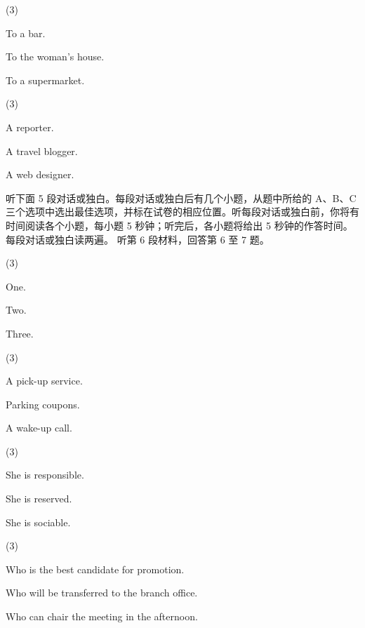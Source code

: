 \documentclass{英语试卷}
\begin{document}
\begin{choices}(3)
  \item To a bar.
  \item To the woman's house.
  \item To a supermarket.
\end{choices}
\begin{choices}(3)
  \item A reporter.
  \item A travel blogger.
  \item A web designer.
\end{choices}
\par 听下面 5 段对话或独白。每段对话或独白后有几个小题，从题中所给的 A、B、C 三个选项中选出最佳选项，并标在试卷的相应位置。听每段对话或独白前，你将有时间阅读各个小题，每小题 5 秒钟；听完后，各小题将给出 5 秒钟的作答时间。每段对话或独白读两遍。 听第 6 段材料，回答第 6 至 7 题。\par
{}
\begin{choices}(3)
  \item One.
  \item Two.
  \item Three.
\end{choices}
\begin{choices}(3)
  \item A pick-up service.
  \item Parking coupons.
  \item A wake-up call.
\end{choices}
\begin{choices}(3)
  \item She is responsible.
  \item She is reserved.
  \item She is sociable.
\end{choices}
\begin{choices}(3)
  \item Who is the best candidate for promotion.
  \item Who will be transferred to the branch office.
  \item Who can chair the meeting in the afternoon.
\end{choices}
\end{document}
